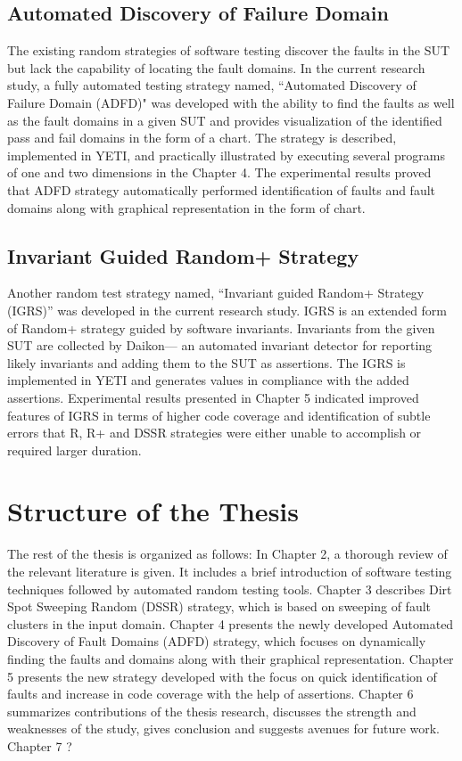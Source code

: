 \subsection{Automated Discovery of Failure Domain}
The existing random strategies of software testing discover the faults in the SUT but lack the capability of locating the fault domains. In the current research study, a fully automated testing strategy named, ``Automated Discovery of Failure Domain (ADFD)" was developed with the ability to find the faults as well as the fault domains in a given SUT and provides visualization of the identified pass and fail domains in the form of a chart. The strategy is described, implemented in YETI, and practically illustrated by executing several programs of one and two dimensions in the Chapter 4. The experimental results proved that ADFD strategy automatically performed identification of faults and fault domains along with graphical representation in the form of chart.

\subsection{Invariant Guided Random+ Strategy}
Another random test strategy named, “Invariant guided Random+ Strategy (IGRS)” was developed in the current research study. IGRS is an extended form of Random+ strategy guided by software invariants. Invariants from the given SUT are collected by Daikon— an automated invariant detector for reporting likely invariants and adding them to the SUT as assertions. The IGRS is implemented in YETI and generates values in compliance with the added assertions. Experimental results presented in Chapter 5 indicated improved features of IGRS in terms of higher code coverage and identification of subtle errors that R, R+ and DSSR strategies were either unable to accomplish or required larger duration.  



 
\section{Structure of the Thesis}
%
The rest of the thesis is organized as follows: In Chapter 2, a thorough review of the relevant literature is given. It includes a brief introduction of software testing techniques followed by automated random testing tools. Chapter 3 describes Dirt Spot Sweeping Random (DSSR) strategy, which is based on sweeping of fault clusters in the input domain. Chapter 4 presents the newly developed Automated Discovery of Fault Domains  (ADFD) strategy, which focuses on dynamically finding the faults and domains along with their graphical representation. Chapter 5 presents the new strategy developed with the focus on quick identification of faults and increase in code coverage with the help of assertions. Chapter 6 summarizes contributions of the thesis research, discusses the strength and weaknesses of the study, gives conclusion and suggests avenues for future work. Chapter 7 ?






